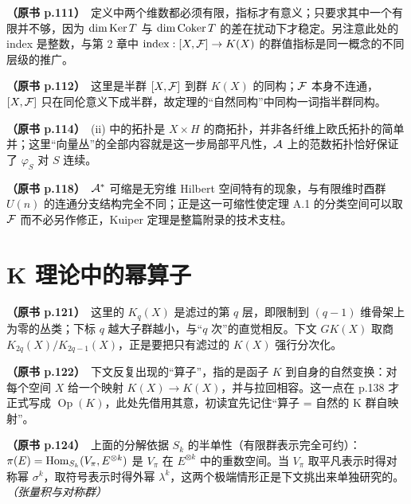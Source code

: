 \noindent \textbf{（原书 p.111）}\ 定义中两个维数都必须有限，指标才有意义；只要求其中一个有限并不够，因为 $\dim\operatorname{Ker} T$ 与 $\dim\operatorname{Coker} T$ 的差在扰动下才稳定。另注意此处的 index 是整数，与第 2 章中 $\operatorname{index}:[X,\mathcal{F}]\to K(X)$ 的群值指标是同一概念的不同层级的推广。\par\smallskip

\noindent \textbf{（原书 p.112）}\ 这里是半群 $[X,\mathcal{F}]$ 到群 $K(X)$ 的同构；$\mathcal{F}$ 本身不连通，$[X,\mathcal{F}]$ 只在同伦意义下成半群，故定理的“自然同构”中同构一词指半群同构。\par\smallskip

\noindent \textbf{（原书 p.114）}\ (ii) 中的拓扑是 $X\times H$ 的商拓扑，并非各纤维上欧氏拓扑的简单并；这里“向量丛”的全部内容就是这一步局部平凡性，$\mathcal{A}$ 上的范数拓扑恰好保证了 $\varphi_S$ 对 $S$ 连续。\par\smallskip

\noindent \textbf{（原书 p.118）}\ $\mathcal{A}^*$ 可缩是无穷维 Hilbert 空间特有的现象，与有限维时酉群 $U(n)$ 的连通分支结构完全不同；正是这一可缩性使定理 A.1 的分类空间可以取 $\mathcal{F}$ 而不必另作修正，Kuiper 定理是整篇附录的技术支柱。\par\smallskip

\section*{K 理论中的幂算子}

\noindent \textbf{（原书 p.121）}\ 这里的 $K_q(X)$ 是滤过的第 $q$ 层，即限制到 $(q-1)$ 维骨架上为零的丛类；下标 $q$ 越大子群越小，与“$q$ 次”的直觉相反。下文 $GK(X)$ 取商 $K_{2q}(X)/K_{2q-1}(X)$，正是要把只有滤过的 $K(X)$ 强行分次化。\par\smallskip

\noindent \textbf{（原书 p.122）}\ 下文反复出现的“算子”，指的是函子 $K$ 到自身的自然变换：对每个空间 $X$ 给一个映射 $K(X)\to K(X)$，并与拉回相容。这一点在 p.138 才正式写成 $\operatorname{Op}(K)$，此处先借用其意，初读宜先记住“算子 = 自然的 K 群自映射”。\par\smallskip

\noindent \textbf{（原书 p.124）}\ 上面的分解依据 $S_k$ 的半单性（有限群表示完全可约）：$\pi(E)=\operatorname{Hom}_{S_k}(V_\pi,E^{\otimes k})$ 是 $V_\pi$ 在 $E^{\otimes k}$ 中的重数空间。当 $V_\pi$ 取平凡表示时得对称幂 $\sigma^k$，取符号表示时得外幂 $\lambda^k$，这两个极端情形正是下文挑出来单独研究的。 \textit{（张量积与对称群）}\par\smallskip

